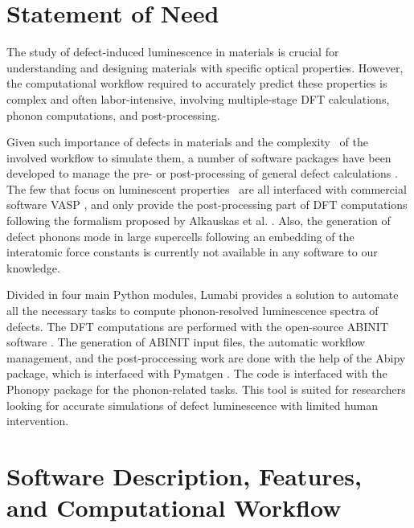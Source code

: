 \section{Statement of Need}

The study of defect-induced luminescence in materials is crucial for understanding and designing materials with specific optical properties. However, the computational workflow required to accurately predict these properties is complex and often labor-intensive, involving multiple-stage DFT calculations, phonon computations, and post-processing.

Given such importance of defects in materials and the complexity~ of the involved workflow to simulate them, a number of software packages have been developed to manage the pre- or post-processing of general defect calculations \cite{naik2018coffee, pean2017presentation, goyal2017computational, broberg2018pycdt, kumagai2021insights, neilson2022defap, arrigoni2021spinney, shen2024pymatgen}. The few that focus on luminescent properties~\cite{Kavanagh2024, turiansky2021nonrad, cavignac2024} are all interfaced with commercial software VASP \cite{kresse1996efficiency}, and only provide the post-processing part of DFT computations following the formalism proposed by Alkauskas et al. \cite{alkauskas2014}.  Also, the generation of defect phonons mode in large supercells following an embedding of the interatomic force constants is currently not available in any software to our knowledge.  

Divided in four main Python modules, Lumabi provides a solution to automate all the necessary tasks to compute phonon-resolved luminescence spectra of defects. The DFT computations are performed with the open-source ABINIT software \cite{gonze2002first, gonze2009abinit, gonze2016recent, gonze2020abinit}. The generation of ABINIT input files, the automatic workflow management, and the post-proccessing work are done with the help of the Abipy package, which is interfaced with Pymatgen \cite{ong2013python}. The code is interfaced with the Phonopy \cite{togo2015first,togo2023first} package for the phonon-related tasks. This tool is suited for researchers looking for accurate simulations of defect luminescence with limited human intervention.

\section{Software Description, Features, and Computational Workflow}

